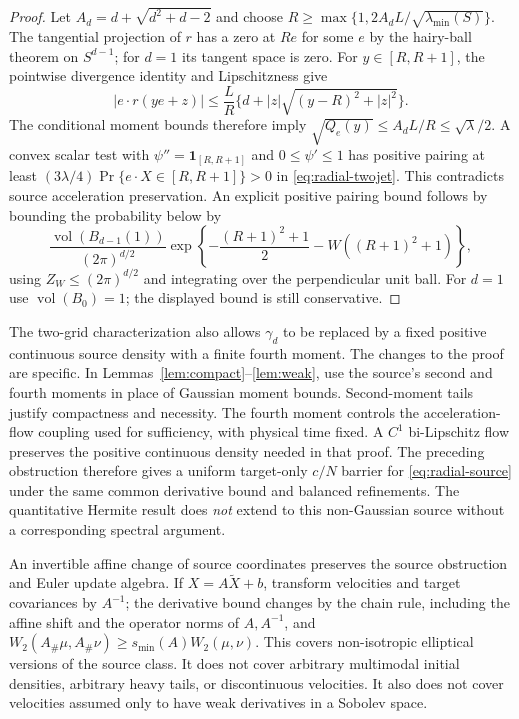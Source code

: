 \begin{proof}
Let $A_d=d+\sqrt{d^2+d-2}$ and choose
$R\ge\max\{1,2A_dL/\sqrt{\lambda_{\min}(S)}\}$.
The tangential projection of $r$ has a zero at $Re$ for some $e$ by the
hairy-ball theorem on $S^{d-1}$; for $d=1$ its tangent space is zero.
For $y\in[R,R+1]$, the pointwise divergence identity and Lipschitzness give
\[
 |e\cdot r(ye+z)|\le\frac L R
       \{d+|z|\sqrt{(y-R)^2+|z|^2}\}.
\]
The conditional moment bounds therefore imply
$\sqrt{Q_e(y)}\le A_dL/R\le\sqrt\lambda/2$.
A convex scalar test with $\psi''=\mathbf1_{[R,R+1]}$ and
$0\le\psi'\le1$ has positive pairing at least
$(3\lambda/4)\Pr\{e\cdot X\in[R,R+1]\}>0$ in
\eqref{eq:radial-twojet}. This contradicts source acceleration preservation.
An explicit positive pairing bound follows by bounding the probability below
by
\begin{equation}
 \frac{\operatorname{vol}(B_{d-1}(1))}{(2\pi)^{d/2}}
 \exp\left\{-\frac{(R+1)^2+1}{2}
              -W((R+1)^2+1)\right\},
 \label{eq:radial-strip-mass}
\end{equation}
using $Z_W\le(2\pi)^{d/2}$ and integrating over the perpendicular unit
ball. For $d=1$ use $\operatorname{vol}(B_0)=1$; the displayed bound is
still conservative.
\end{proof}

The two-grid characterization also allows $\gamma_d$ to be replaced by
a fixed positive continuous source density with a finite fourth moment.
The changes to the proof are specific. In
Lemmas~\ref{lem:compact}--\ref{lem:weak}, use the source's second and
fourth moments in place of Gaussian moment bounds. Second-moment tails
justify compactness and necessity. The fourth moment controls the
acceleration-flow coupling used for sufficiency, with physical time fixed.
A $C^1$ bi-Lipschitz flow preserves the positive continuous density needed
in that proof. The preceding
obstruction therefore gives a uniform target-only $c/N$ barrier for
\eqref{eq:radial-source} under the same common derivative bound and balanced
refinements. The quantitative Hermite result does \emph{not} extend to
this non-Gaussian source without a corresponding spectral argument.

An invertible affine change of source coordinates preserves the source
obstruction and Euler update algebra. If $X=A\widetilde X+b$, transform
velocities and target covariances by $A^{-1}$; the derivative bound changes by the chain rule, including the affine
shift and the operator norms of $A,A^{-1}$, and
$W_2(A_\#\mu,A_\#\nu)\ge s_{\min}(A)W_2(\mu,\nu)$.
This covers non-isotropic elliptical versions of the source class. It does
not cover arbitrary multimodal initial densities, arbitrary heavy tails,
or discontinuous velocities. It also does not cover velocities assumed only
to have weak derivatives in a Sobolev space.

